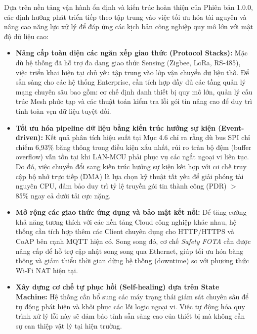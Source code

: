     Dựa trên nền tảng vận hành ổn định và kiến trúc hoàn thiện của Phiên bản 1.0.0, các định hướng phát triển tiếp theo tập trung vào việc tối ưu hóa tài nguyên và nâng cao năng lực xử lý để đáp ứng các kịch bản công nghiệp quy mô lớn với mật độ dữ liệu cao:

    \begin{itemize}
        \item \textbf{Nâng cấp toàn diện các ngăn xếp giao thức (Protocol Stacks):} Mặc dù hệ thống đã hỗ trợ đa dạng giao thức Sensing (Zigbee, LoRa, RS-485), việc triển khai hiện tại chủ yếu tập trung vào lớp vận chuyển dữ liệu thô. Để sẵn sàng cho các hệ thống Enterprise, cần tích hợp đầy đủ các tầng quản lý mạng chuyên sâu bao gồm: cơ chế định danh thiết bị quy mô lớn, quản lý cấu trúc Mesh phức tạp và các thuật toán kiểm tra lỗi gói tin nâng cao để duy trì tính toàn vẹn dữ liệu tuyệt đối.
        
        \item \textbf{Tối ưu hóa pipeline dữ liệu bằng kiến trúc hướng sự kiện (Event-driven):} Kết quả phân tích hiệu suất tại Mục 4.6 chỉ ra rằng dù bus SPI chỉ chiếm 6,93\% băng thông trong điều kiện xấu nhất, rủi ro tràn bộ đệm (buffer overflow) vẫn tồn tại khi LAN-MCU phải phục vụ các ngắt ngoại vi liên tục. Do đó, việc chuyển đổi sang kiến trúc hướng sự kiện kết hợp với cơ chế truy cập bộ nhớ trực tiếp (DMA) là lựa chọn kỹ thuật tất yếu để giải phóng tài nguyên CPU, đảm bảo duy trì tỷ lệ truyền gói tin thành công (PDR) $>$ 85\% ngay cả dưới tải cực nặng.
        
        \item \textbf{Mở rộng các giao thức ứng dụng và bảo mật kết nối:} Để tăng cường khả năng tương thích với các nền tảng Cloud công nghiệp khác nhau, hệ thống cần tích hợp thêm các Client chuyên dụng cho HTTP/HTTPS và CoAP bên cạnh MQTT hiện có. Song song đó, cơ chế \textit{Safety FOTA} cần được nâng cấp để hỗ trợ cập nhật song song qua Ethernet, giúp tối ưu hóa băng thông và giảm thiểu thời gian dừng hệ thống (downtime) so với phương thức Wi-Fi NAT hiện tại.
        
        \item \textbf{Xây dựng cơ chế tự phục hồi (Self-healing) dựa trên State Machine:} Hệ thống cần bổ sung các máy trạng thái giám sát chuyên sâu để tự động phát hiện và khôi phục các lỗi logic ngoại vi. Việc tự động hóa quy trình xử lý lỗi này sẽ đảm bảo tính sẵn sàng cao của thiết bị mà không cần sự can thiệp vật lý tại hiện trường.
    \end{itemize}

